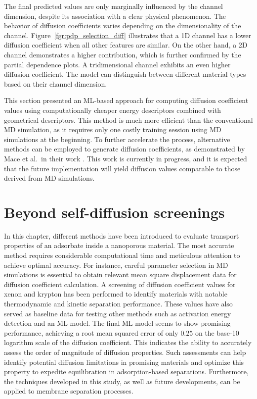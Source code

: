 \documentclass[main]{subfiles}
\begin{document}
The final predicted values are only marginally influenced by the channel dimension, despite its association with a clear physical phenomenon. The behavior of diffusion coefficients varies depending on the dimensionality of the channel. Figure~\ref{fgr:pdp_selection_diff} illustrates that a 1D channel has a lower diffusion coefficient when all other features are similar. On the other hand, a 2D channel demonstrates a higher contribution, which is further confirmed by the partial dependence plots. A tridimensional channel exhibits an even higher diffusion coefficient. The model can distinguish between different material types based on their channel dimension.

This section presented an ML-based approach for computing diffusion coefficient values using computationally cheaper energy descriptors combined with geometrical descriptors. This method is much more efficient than the conventional MD simulation, as it requires only one costly training session using MD simulations at the beginning. To further accelerate the process, alternative methods can be employed to generate diffusion coefficients, as demonstrated by Mace et al.\ in their work \autocite{Mace_2019}. This work is currently in progress, and it is expected that the future implementation will yield diffusion values comparable to those derived from MD simulations.

\clearpage
\section{Beyond self-diffusion screenings}

In this chapter, different methods have been introduced to evaluate transport properties of an adsorbate inside a nanoporous material. The most accurate method requires considerable computational time and meticulous attention to achieve optimal accuracy. For instance, careful parameter selection in MD simulations is essential to obtain relevant mean square displacement data for diffusion coefficient calculation. A screening of diffusion coefficient values for xenon and krypton has been performed to identify materials with notable thermodynamic and kinetic separation performance. These values have also served as baseline data for testing other methods such as activation energy detection and an ML model. The final ML model seems to show promising performance, achieving a root mean squared error of only $0.25$ on the base-10 logarithm scale of the diffusion coefficient. This indicates the ability to accurately assess the order of magnitude of diffusion properties. Such assessments can help identify potential diffusion limitations in promising materials and optimize this property to expedite equilibration in adsorption-based separations. Furthermore, the techniques developed in this study, as well as future developments, can be applied to membrane separation processes.
\end{document}
